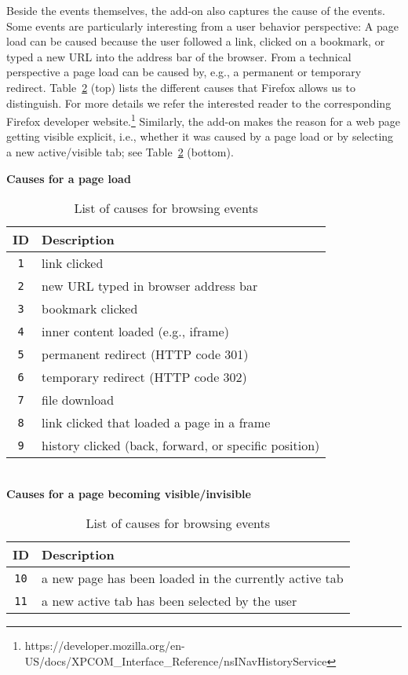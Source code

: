 \documentclass[11pt,fleqn,twoside]{article}
\begin{document}
Beside the events themselves, the add-on also captures the cause of the events. Some events are particularly interesting from a user behavior perspective: A page load can be caused because the user followed a link, clicked on a bookmark, or typed a new URL into the address bar of the browser. From a technical perspective a page load can be caused by, e.g., a permanent or temporary redirect. Table~\ref{tab:browsing_event_causes} (top) lists the different causes that Firefox allows us to distinguish. For more details we refer the interested reader to the corresponding Firefox developer website.\footnote{https://developer.mozilla.org/en-US/docs/XPCOM\_Interface\_Reference/nsINavHistoryService} Similarly, the add-on makes the reason for a web page getting visible explicit, i.e., whether it was caused by a page load or by selecting a new active/visible tab; see Table~\ref{tab:browsing_event_causes} (bottom).
\begin{table}
\small
\begin{center}
\textbf{Causes for a page load}\\ \vspace{0.1cm}
\begin{tabular}{|c|p{8cm}|}
  \hline
  \textbf{ID} & \textbf{Description} \\
  \hline\hline
  \texttt{1}   & link clicked \\
  \hline
  \texttt{2}   & new URL typed in browser address bar \\
  \hline
  \texttt{3}   & bookmark clicked \\
  \hline
  \texttt{4}   & inner content loaded (e.g., iframe)\\
  \hline
  \texttt{5}   & permanent redirect (HTTP code 301) \\
  \hline
  \texttt{6}   & temporary redirect (HTTP code 302)\\
  \hline
  \texttt{7}   & file download\\
  \hline
  \texttt{8}   & link clicked that loaded a page in a frame \\
  \hline
  \texttt{9}   & history clicked (back, forward, or specific position)\\
  \hline
\end{tabular} 
\\
\vspace{0.5cm}
\textbf{Causes for a page becoming visible/invisible}\\ \vspace{0.1cm}
\begin{tabular}{|c|p{8cm}|}
  \hline
  \textbf{ID} & \textbf{Description} \\
  \hline\hline
  \texttt{10}   & a new page has been loaded in the currently active tab \\
  \hline
  \texttt{11}   & a new active tab has been selected by the user \\
  \hline
\end{tabular} 
\end{center}
\caption{List of causes for browsing events} 
\label{tab:browsing_event_causes}
\end{table}
\end{document}

